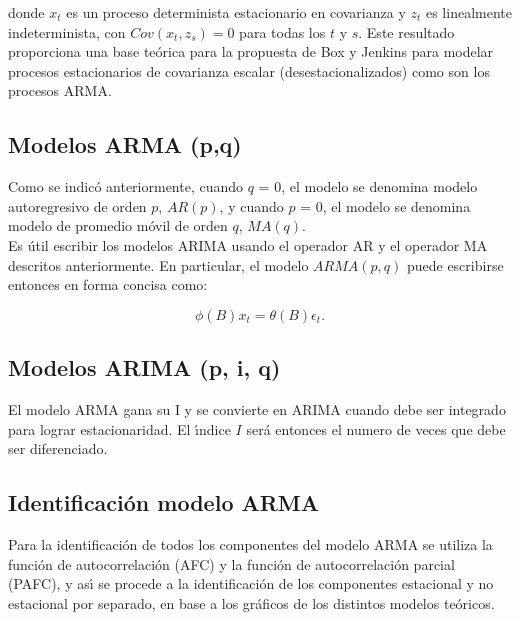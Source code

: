 donde $x_t$ es un proceso determinista estacionario en covarianza y $z_t$ es linealmente indeterminista,
con $Cov (x_t, z_s) = 0$ para todas los $t$ y $s$. Este resultado proporciona una base te\'orica para la propuesta de Box y Jenkins  para modelar procesos estacionarios de covarianza escalar (desestacionalizados) como son los procesos ARMA.

\subsection{Modelos ARMA (p,q)}

Como se indic\'o anteriormente, cuando $q$ = 0, el modelo se denomina modelo autoregresivo de orden $p$, $AR (p)$, y cuando $p$ = 0, el modelo se denomina modelo de promedio m\'ovil de orden $q$, $MA (q)$. \\
Es \'util escribir los modelos ARIMA usando el operador AR y el operador MA descritos anteriormente. En particular, el modelo $ARMA (p, q) $ puede escribirse entonces en forma concisa como:

\begin{equation}
\phi (B) x_t = \theta (B) \epsilon_t.
\end{equation}
\subsection{Modelos ARIMA (p, i, q)}
El modelo ARMA gana su I y se convierte en ARIMA cuando debe ser integrado para lograr estacionaridad. El \'{\i}ndice $I$ ser\'a entonces el numero de veces que debe ser diferenciado.

\subsection{Identificaci\'on modelo ARMA}

Para la identificaci\'on de todos los componentes del modelo ARMA se utiliza la funci\'on de autocorrelaci\'on (AFC) y la funci\'on de autocorrelaci\'on parcial (PAFC), y as\'{\i} se procede a la identificaci\'on de los componentes estacional y no estacional por separado, en base a los gr\'aficos de los distintos modelos te\'oricos.

